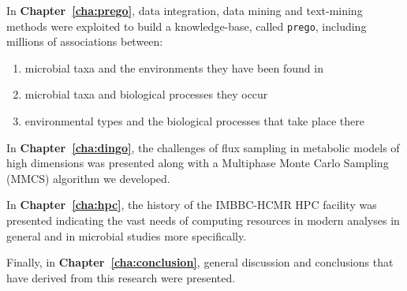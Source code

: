    In \textbf{Chapter~\ref{cha:prego}}, data integration, data mining and text-mining methods were exploited to build a knowledge-base, called \texttt{prego}, including millions of associations between:
   \begin{enumerate}
      \item microbial taxa and the environments they have been found in 
      \item microbial taxa and biological processes they occur
      \item environmental types and the biological processes that take place there
   \end{enumerate}

   In \textbf{Chapter~\ref{cha:dingo}}, the challenges of flux sampling in metabolic models of high dimensions was presented along with a Multiphase Monte Carlo Sampling (MMCS) algorithm we developed. 

   In \textbf{Chapter~\ref{cha:hpc}}, the history of the IMBBC-HCMR HPC facility was presented indicating the vast needs of computing resources in modern analyses in general and in microbial studies more specifically. 


   Finally, in \textbf{Chapter~\ref{cha:conclusion}}, general discussion and conclusions that have derived from this research were presented. 





% 
